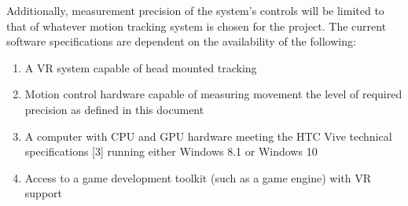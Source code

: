 \documentclass[onecolumn, draftclsnofoot,10pt, compsoc]{IEEEtran}
\newcounter{threesection}[subsubsection]
\begin{document}
Additionally, measurement precision of the system’s controls will be limited to that of whatever motion tracking system is chosen for the project.
The current software specifications are dependent on the availability of the following:
\begin{enumerate}
	\item A VR system capable of head mounted tracking
	\item Motion control hardware capable of measuring movement the level of required precision as defined in this document
	\item A computer with CPU and GPU hardware meeting the HTC Vive technical specifications [3] running either Windows 8.1 or Windows 10
	\item Access to a game development toolkit (such as a game engine) with VR support
\end{enumerate}
\end{document}
